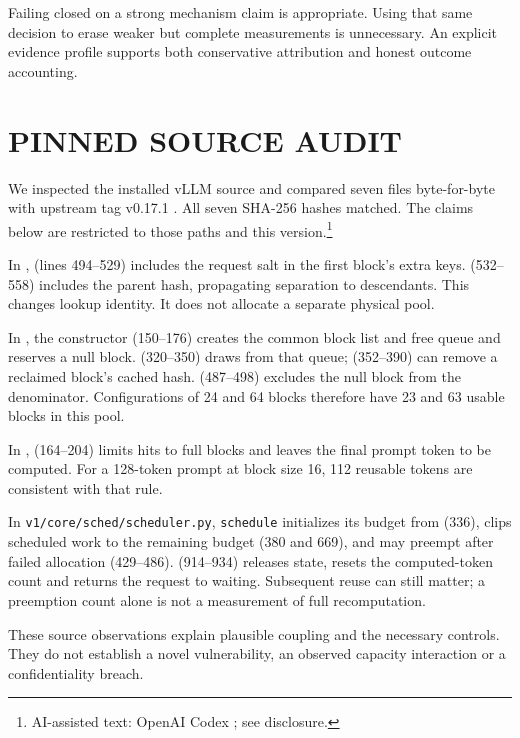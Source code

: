 \documentclass[a4paper,twoside]{article}
\newcommand{\aicite}{\footnote{AI-assisted text: OpenAI Codex \cite{codex}; see disclosure.}}
\begin{document}
Failing closed on a strong mechanism claim is appropriate. Using that same decision to erase weaker but complete measurements is unnecessary. An explicit evidence profile supports both conservative attribution and honest outcome accounting.

\section{\uppercase{Pinned Source Audit}}

We inspected the installed vLLM source and compared seven files byte-for-byte with upstream tag v0.17.1 \cite{vllm}. All seven SHA-256 hashes matched. The claims below are restricted to those paths and this version.\aicite

In ,  (lines 494--529) includes the request salt in the first block's extra keys.  (532--558) includes the parent hash, propagating separation to descendants. This changes lookup identity. It does not allocate a separate physical pool.

In , the constructor (150--176) creates the common block list and free queue and reserves a null block.  (320--350) draws from that queue;  (352--390) can remove a reclaimed block's cached hash.  (487--498) excludes the null block from the denominator. Configurations of 24 and 64 blocks therefore have 23 and 63 usable blocks in this pool.

In ,  (164--204) limits hits to full blocks and leaves the final prompt token to be computed. For a 128-token prompt at block size 16, 112 reusable tokens are consistent with that rule.

In \texttt{v1/core/sched/scheduler.py}, \texttt{schedule} initializes its budget from  (336), clips scheduled work to the remaining budget (380 and 669), and may preempt after failed allocation (429--486).  (914--934) releases state, resets the computed-token count and returns the request to waiting. Subsequent reuse can still matter; a preemption count alone is not a measurement of full recomputation.

These source observations explain plausible coupling and the necessary controls. They do not establish a novel vulnerability, an observed capacity interaction or a confidentiality breach.
\end{document}
